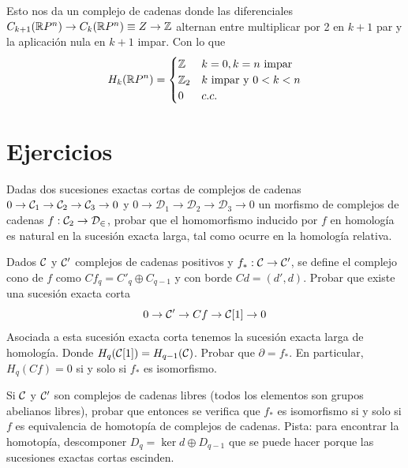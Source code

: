 \documentclass[TA.tex]{subfiles}
\begin{document}
\begin{ej}
Esto nos da un complejo de cadenas donde las diferenciales $C_{k+1}(\mathbb{R} P^n)\to C_k(\mathbb{R} P^n)\equiv Z\to\mathbb{Z}$ alternan entre multiplicar por 2 en $k+1$ par y la aplicación nula en $k+1$ impar. Con lo que
\[
H_k(\mathbb{R} P^n)=\begin{cases}
\mathbb{Z} & k=0, k=n\text{ impar}\\
\mathbb{Z}_2 & k\text{ impar y }0<k<n\\
0 & c.c.
\end{cases}
\]
\end{ej}







\section{Ejercicios}
\begin{ejer}
Dadas dos sucesiones exactas cortas de complejos de cadenas $0\to \mathcal{C}_1\to \mathcal{C}_2\to\mathcal{C}_3\to 0$ y $0\to \mathcal{D}_1\to \mathcal{D}_2\to\mathcal{D}_3\to 0$ un morfismo de complejos de cadenas $f:\mathcal{C}_2\to\mathcal{D_2}$, probar que el homomorfismo inducido por $f$ en homología es natural en la sucesión exacta larga, tal como ocurre en la homología relativa. 
\end{ejer}

\begin{ejer}
Dados $\mathcal{C}$ y $\mathcal{C}'$ complejos de cadenas positivos y $f_*:\mathcal{C}\to\mathcal{C}'$, se define el complejo cono de $f$ como $Cf_q=C'_q\oplus C_{q-1}$ y con borde $Cd=(d',d)$. Probar que existe una sucesión exacta corta
\[
0\to \mathcal{C}'\to Cf\to \mathcal{C}[1]\to 0
\]
Asociada a esta sucesión exacta corta tenemos la sucesión exacta larga de homología. Donde $H_q(\mathcal{C}[1])=H_{q-1}(\mathcal{C})$. Probar que $\partial=f_*$. En particular, $H_q(Cf)=0$ si y solo si $f_*$ es isomorfismo. 

Si $\mathcal{C}$ y $\mathcal{C}'$ son complejos de cadenas libres (todos los elementos son grupos abelianos libres), probar que entonces se verifica que $f_*$ es isomorfismo si y solo si $f$ es equivalencia de homotopía de complejos de cadenas.  Pista: para encontrar la homotopía, descomponer $D_q=\ker d\oplus D_{q-1}$ que se puede hacer porque las sucesiones exactas cortas escinden. 

\end{ejer}
\end{document}
